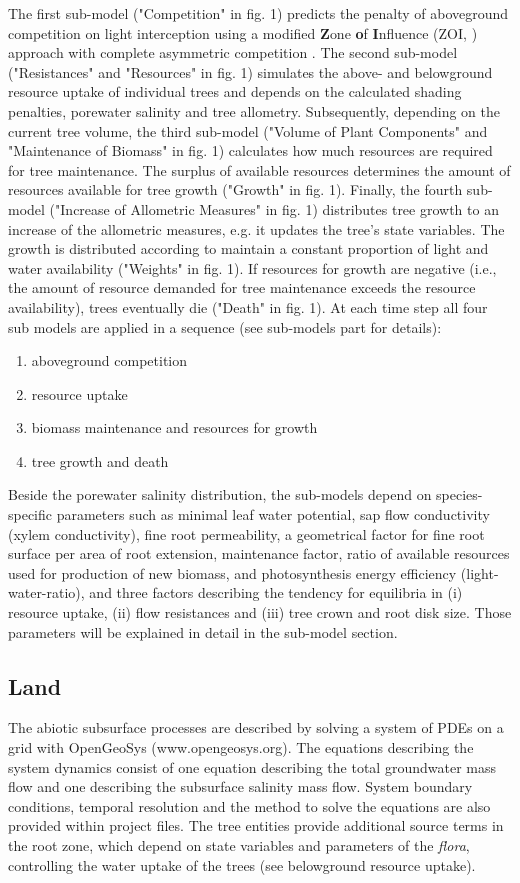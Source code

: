 \documentclass[manusscript, 12p, authoryear]{elsarticle}
\begin{document}
The first sub-model ("Competition" in fig. 1) predicts the penalty of aboveground competition on light interception using a modified \textbf{Z}one \textbf{o}f \textbf{I}nfluence (ZOI, \citet{Gates1978}) approach with complete asymmetric competition \citep{Schwinning1998}.
The second sub-model ("Resistances" and "Resources" in fig. 1) simulates the above- and belowground resource uptake of individual trees and depends on the calculated shading penalties, porewater salinity and tree allometry.
Subsequently, depending on the current tree volume, the third sub-model ("Volume of Plant Components" and "Maintenance of Biomass" in fig. 1) calculates how much resources are required for tree maintenance.
The surplus of available resources determines the amount of resources available for tree growth ("Growth" in fig. 1). 
Finally, the fourth sub-model ("Increase of Allometric Measures" in fig. 1) distributes tree growth to an increase of the allometric measures, e.g. it updates the tree's state variables.
The growth is distributed according to maintain a constant proportion of light and water availability ("Weights" in fig. 1).
If resources for growth are negative (i.e., the amount of resource demanded for tree maintenance exceeds the resource availability), trees eventually die ("Death" in fig. 1).
At each time step all four sub models are applied in a sequence (see sub-models part for details): 
\begin{enumerate}
\item aboveground competition
\item resource uptake
\item biomass maintenance and resources for growth
\item tree growth and death
\end{enumerate}
Beside the porewater salinity distribution, the sub-models depend on species-specific parameters such as minimal leaf water potential, sap flow conductivity (xylem conductivity), fine root permeability, a geometrical factor for fine root surface per area of root extension, maintenance factor, ratio of available resources used for production of new biomass, and photosynthesis energy efficiency (light-water-ratio), and three factors describing the tendency for equilibria in (i) resource uptake, (ii) flow resistances and (iii) tree crown and root disk size.
Those parameters will be explained in detail in the sub-model section.
\subsection{Land}
The abiotic subsurface processes are described by solving a system of PDEs on a grid with OpenGeoSys (www.opengeosys.org).
The equations describing the system dynamics consist of one equation describing the total groundwater mass flow and one describing the subsurface salinity mass flow.
System boundary conditions, temporal resolution and the method to solve the equations are also provided within project files.
The tree entities provide additional source terms in the root zone, which depend on state variables and parameters of the \textit{flora}, controlling the water uptake of the trees (see belowground resource uptake).
\end{document}
